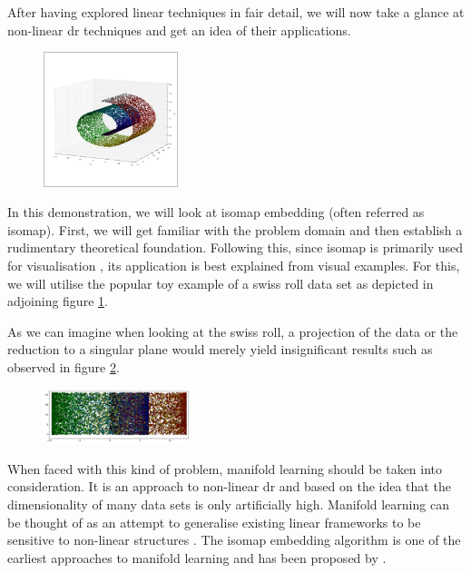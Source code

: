 After having explored linear techniques in fair detail, we will now take a glance at non-linear \acrlong{dr} techniques and get an idea of their applications.

\begin{figure}
	\centering
	\includegraphics[width=0.35\textwidth]{external_content/graphs/swiss_roll.png}
	\captionsetup{justification=centering}
	\label{fig:swissrollfull}
\end{figure}

In this demonstration, we will look at isomap embedding (often referred as isomap).
First, we will get familiar with the problem domain and then establish a rudimentary theoretical foundation.
Following this, since isomap is primarily used for visualisation \cite{HandsOnMLCh8}, its application is best explained from visual examples.
For this, we will utilise the popular toy example of a swiss roll data set as depicted in adjoining figure \ref{fig:swissrollfull}.

As we can imagine when looking at the swiss roll, a projection of the data or the reduction to a \gls{singular} plane would merely yield insignificant results such as observed in figure \ref{fig:swissrollprojection}.

\begin{figure}
	\centering
	\includegraphics[width=0.38\textwidth]{external_content/graphs/swiss_roll-projection.png}
	\captionsetup{justification=centering}
	\label{fig:swissrollprojection}
\end{figure}

\noindent When faced with this kind of problem, manifold learning should be taken into consideration.
It is an approach to non-linear \gls{dr} and based on the idea that the dimensionality of many data sets is only artificially high.
Manifold learning can be thought of as an attempt to generalise existing linear frameworks to be sensitive to non-linear structures \cite{scikit-learn}.
The isomap embedding algorithm is one of the earliest approaches to manifold learning and has been proposed by .


